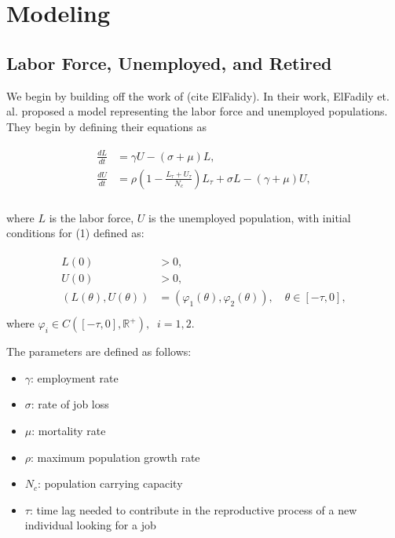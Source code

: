 \documentclass{article}
\begin{document}
\section{Modeling}

\subsection{Labor Force, Unemployed, and Retired}

We begin by building off the work of (cite ElFalidy). In their work, ElFadily et. al. proposed a model
 representing the labor force and unemployed populations. They begin by defining their equations as

\begin{align}
    \begin{split}
        \frac{dL}{dt} &= \gamma U - (\sigma + \mu)L, \\
        \frac{dU}{dt} &= \rho \left(1 - \frac{L_{\tau} + U_{\tau}}{N_c} \right)L_{\tau} + \sigma L - (\gamma + \mu)U, \\
    \end{split}
\end{align}

where $L$ is the labor force, $U$ is the unemployed population, with initial conditions for (1) defined as:

\begin{align}
    \begin{split}
        L(0) &> 0 , \\
        U(0) &> 0, \\
        (L(\theta),U(\theta)) &= (\varphi_1(\theta), \varphi_2(\theta)), \quad \theta \in [-\tau,0], \\
    \end{split}
\end{align}
where $\varphi_i\in C([-\tau, 0], \mathbb{R}^+),\;\; i=1,2$.

The parameters are defined as follows:

\begin{itemize}
    \item $\gamma$: employment rate
    \item $\sigma$: rate of job loss 
    \item $\mu$: mortality rate
    \item $\rho$: maximum population growth rate 
    \item $N_c$: population carrying capacity 
    \item $\tau$: time lag needed to contribute in the reproductive process of a new individual looking for a job
\end{itemize}
 
\end{document}
